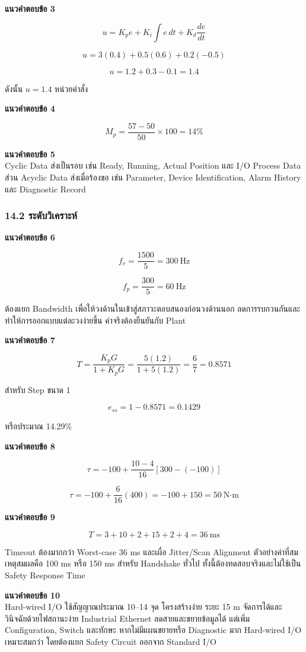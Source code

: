 \textbf{แนวคำตอบข้อ 3}

\[
u=K_pe+K_i\int e\,dt+K_d\frac{de}{dt}
\]

\[
u=3(0.4)+0.5(0.6)+0.2(-0.5)
\]

\[
u=1.2+0.3-0.1=1.4
\]

ดังนั้น $u=1.4$ หน่วยคำสั่ง

\textbf{แนวคำตอบข้อ 4}

\[
M_p=\frac{57-50}{50}\times100=14\%
\]

\textbf{แนวคำตอบข้อ 5} \\
Cyclic Data ส่งเป็นรอบ เช่น Ready, Running, Actual Position และ I/O Process Data ส่วน Acyclic Data ส่งเมื่อร้องขอ เช่น Parameter, Device Identification, Alarm History และ Diagnostic Record

\subsubsection{14.2 ระดับวิเคราะห์}

\textbf{แนวคำตอบข้อ 6}

\[
f_v=\frac{1500}{5}=300\ \text{Hz}
\]

\[
f_p=\frac{300}{5}=60\ \text{Hz}
\]

ต้องแยก Bandwidth เพื่อให้วงด้านในเข้าสู่สภาวะตอบสนองก่อนวงด้านนอก ลดการรบกวนกันและทำให้การออกแบบแต่ละวงง่ายขึ้น ค่าจริงต้องยืนยันกับ Plant

\textbf{แนวคำตอบข้อ 7}

\[
T=\frac{K_pG}{1+K_pG}=\frac{5(1.2)}{1+5(1.2)}=\frac{6}{7}=0.8571
\]

สำหรับ Step ขนาด 1

\[
e_{ss}=1-0.8571=0.1429
\]

หรือประมาณ 14.29\%

\textbf{แนวคำตอบข้อ 8}

\[
\tau=-100+\frac{10-4}{16}[300-(-100)]
\]

\[
\tau=-100+\frac{6}{16}(400)=-100+150=50\ \text{N·m}
\]

\textbf{แนวคำตอบข้อ 9}

\[
T=3+10+2+15+2+4=36\ \text{ms}
\]

Timeout ต้องมากกว่า Worst-case 36 ms และเผื่อ Jitter/Scan Alignment ตัวอย่างค่าที่สมเหตุสมผลคือ 100 ms หรือ 150 ms สำหรับ Handshake ทั่วไป ทั้งนี้ต้องทดสอบจริงและไม่ใช้เป็น Safety Response Time

\textbf{แนวคำตอบข้อ 10} \\
Hard-wired I/O ใช้สัญญาณประมาณ 10–14 จุด โครงสร้างง่าย ระยะ 15 m จัดการได้และวินิจฉัยด้วยไฟสถานะง่าย Industrial Ethernet ลดสายและขยายข้อมูลได้ แต่เพิ่ม Configuration, Switch และทักษะ หากไม่มีแผนขยายหรือ Diagnostic มาก Hard-wired I/O เหมาะสมกว่า โดยต้องแยก Safety Circuit ออกจาก Standard I/O

